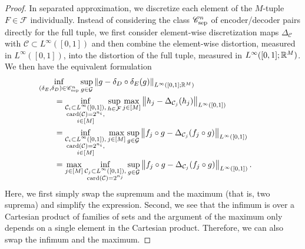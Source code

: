 \documentclass[10pt,a4paper]{amsart}
\newcommand{\set}[1]{\ensuremath{\mathcal{#1}}}
\begin{document}
\begin{proof}
In separated approximation, we discretize each element of the $M$-tuple $F\in\set{F}$ individually.
Instead of considering the class $\sepClass[n]$ of encoder/decoder pairs directly for the full tuple, we first consider element-wise discretization maps $\Delta_{\set{C}}$ with $\set{C}\subset L^\infty([0,1])$ and then combine the element-wise distortion, measured in $L^\infty([0,1])$, into the distortion of the full tuple, measured in $L^\infty([0,1];\rr[M])$.
We then have the equivalent formulation
\begin{align}
    &\kern-2em\inf_{(\encoder,\decoder)\in\sepClass[n]}
    \sup_{g\in\set{G}}
    \norm{g-\decoder\circ\encoder(g)}[{L^\infty([0,1];\rr[M])}]
    \\&
    =
    \inf_{\substack{\set{C}_i\subset L^\infty([0,1]),\\\card{\set{C}}=2^{n_i},\\i\in[M]}}
    \sup_{h\in\set{F}}
    \max_{j\in[M]}
    \norm{h_j-\Delta_{\set{C}_j}(h_j)}[{L^\infty([0,1])}]
    \\&
    =
    \inf_{\substack{\set{C}_i\subset L^\infty([0,1]),\\\card{\set{C}}=2^{n_i},\\i\in[M]}}
    \max_{j\in[M]}
    \sup_{g\in\set{G}}
    \norm{f_j\circ g-\Delta_{\set{C}_j}(f_j\circ g)}[{L^\infty([0,1])}]
    \\&
    =
    \max_{j\in[M]}
    \inf_{\substack{\set{C}_j\subset L^\infty([0,1]),\\\card{\set{C}}=2^{n_j}}}
    \sup_{g\in\set{G}}
    \norm{f_j\circ g-\Delta_{\set{C}_j}(f_j\circ g)}[{L^\infty([0,1])}].
\end{align}
Here, we first simply swap the supremum and the maximum (that is, two suprema) and simplify the expression.
Second, we see that the infimum is over a Cartesian product of families of sets and the argument of the maximum only depends on a single element in the Cartesian product.
Therefore, we can also swap the infimum and the maximum.


\end{proof}
\end{document}
